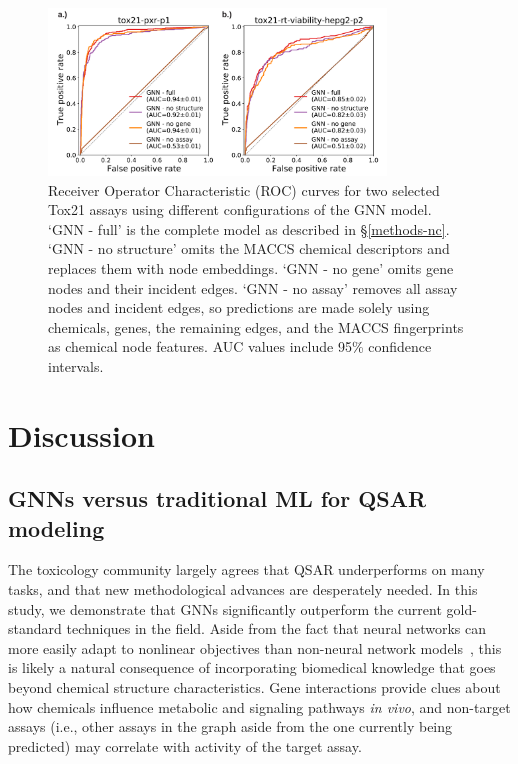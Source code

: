 \documentclass{ws-procs11x85}
\begin{document}
\begin{figure}
   \centering
   \includegraphics[width=0.8\textwidth]{figures/figure5.pdf}
   \caption{Receiver Operator Characteristic (ROC) curves for two selected Tox21 assays using different configurations of the GNN model. `GNN - full' is the complete model as described in \S\ref{methods-nc}. `GNN - no structure' omits the MACCS chemical descriptors and replaces them with node embeddings. `GNN - no gene' omits gene nodes and their incident edges. `GNN - no assay' removes all assay nodes and incident edges, so predictions are made solely using chemicals, genes, the remaining edges, and the MACCS fingerprints as chemical node features. AUC values include 95\% confidence intervals.}\label{fig:5}
\end{figure}

\section{Discussion}

\subsection{GNNs versus traditional ML for QSAR modeling}
The toxicology community largely agrees that QSAR underperforms on many tasks, and that new methodological advances are desperately needed.
In this study, we demonstrate that GNNs significantly outperform the current gold-standard techniques in the field.
Aside from the fact that neural networks can more easily adapt to nonlinear objectives than non-neural network models~\cite{hornik1989multilayer}, this is likely a natural consequence of incorporating biomedical knowledge that goes beyond chemical structure characteristics.
Gene interactions provide clues about how chemicals influence metabolic and signaling pathways \textit{in vivo}, and non-target assays (i.e., other assays in the graph aside from the one currently being predicted) may correlate with activity of the target assay.
\end{document}
